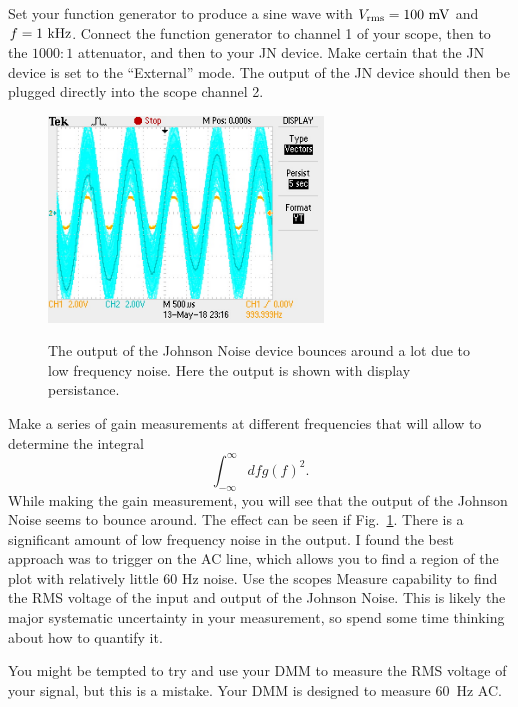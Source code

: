 \documentclass[12pt]{article}
\begin{document}
Set your function generator to produce a sine wave with $V_{\rm rms} = 100~\rm mV$ and $f = 1~\rm kHz$.  Connect the function generator to channel 1 of your scope, then to the $1000:1$ attenuator, and then to your JN device.  Make certain that the JN device is set to the ``External'' mode.  The output of the JN device should then be plugged directly into the scope channel 2.

\begin{figure}[htbp]
\begin{center}
{\includegraphics[width=0.65\textwidth]{figs/gaintrouble.jpg}}
\end{center}
\caption{\label{fig:gaintrouble} The output of the Johnson Noise device bounces around a lot due to low frequency noise.  Here the output is shown with display persistance.}
\end{figure}

Make a series of gain measurements at different frequencies that will allow to determine the integral
\begin{displaymath}
\int_{-\infty}^{\infty} df g(f)^2.
\end{displaymath}
While making the gain measurement, you will see that the output of the Johnson Noise seems to bounce around.  The effect can be seen if Fig.~\ref{fig:gaintrouble}.  There is a significant amount of low frequency noise in the output.  I found the best approach was to trigger on the AC line, which allows you to find a region of the plot with relatively little 60 Hz noise.  Use the scopes Measure capability to find the RMS voltage of the input and output of the Johnson Noise.  This is likely the major systematic uncertainty in your measurement, so spend some time thinking about how to quantify it. 

You might be tempted to try and use your DMM to measure the RMS voltage of your signal, but this is a mistake.  Your DMM is designed to measure 60~\rm Hz AC.
\end{document}
